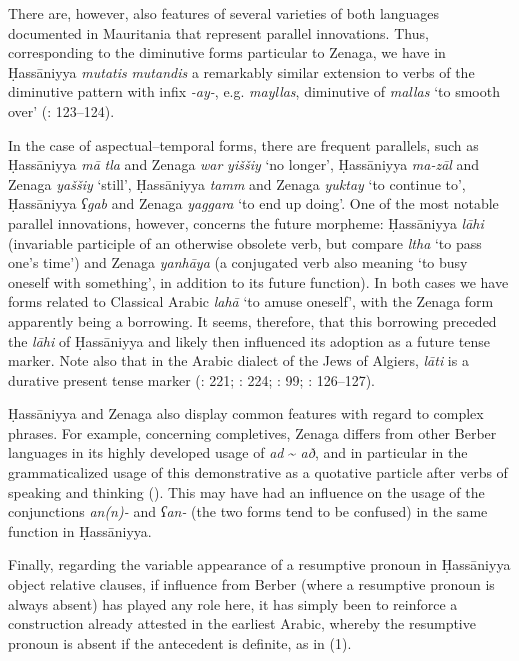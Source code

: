 \documentclass[output=paper]{langsci/langscibook}
\begin{document}
There are, however, also features of several varieties of both languages documented in Mauritania that represent parallel innovations. Thus, corresponding to the diminutive forms particular to Zenaga, we have in Ḥassāniyya \textit{mutatis} \textit{mutandis} a remarkably similar extension to verbs of the diminutive pattern with infix \textit{-ay-}, e.g. \textit{mayllas}, diminutive of \textit{mallas} ‘to smooth over’ (\citealt{Taine-Cheikh2008chapter}: 123–124).

In the case of aspectual--temporal forms, there are frequent parallels, such as Ḥassāniyya \textit{mā} \textit{tla} and Zenaga \textit{war} \textit{yiššiy} ‘no longer’, Ḥassāniyya \textit{ma-zāl} and Zenaga \textit{yaššiy} ‘still’, Ḥassāniyya \textit{tamm} and Zenaga \textit{yuktay} ‘to continue to’, Ḥassāniyya \textit{ʕgab} and Zenaga \textit{yaggara} ‘to end up doing’. One of the most notable parallel innovations, however, concerns the future morpheme: Ḥassāniyya \textit{lāhi} (invariable participle of an otherwise obsolete verb, but compare \textit{ltha} ‘to pass one’s time’) and Zenaga \textit{yanhāya} (a conjugated verb also meaning ‘to busy oneself with something’, in addition to its future function). In both cases we have forms related to Classical Arabic \textit{lahā} ‘to amuse oneself’, with the Zenaga form apparently being a borrowing. It seems, therefore, that this borrowing preceded the \textit{lāhi} of Ḥassāniyya and likely then influenced its adoption as a future tense marker. Note also that in the Arabic dialect of the Jews of Algiers, \textit{lāti} is a durative present tense marker (\citealt{Cohen1924}: 221; \citealt{Taine-Cheikh2004}: 224; \citealt{Taine-Cheikh2009}: 99; \citealt{Taine-Cheikh2010Zenaga}: 126–127).

Ḥassāniyya and Zenaga also display common features with regard to complex phrases. For example, concerning completives, Zenaga differs from other Berber languages in its highly developed usage of \textit{ad} \~{} \textit{að}, and in particular in the grammaticalized usage of this demonstrative as a quotative particle after verbs of speaking and thinking (\citealt{Taine-Cheikh2010Zenaga}). This may have had an influence on the usage of the conjunctions \textit{an(n)-} and \textit{ʕan-} (the two forms tend to be confused) in the same function in Ḥassāniyya.

Finally, regarding the variable appearance of a resumptive pronoun in Ḥassāniyya object relative clauses, if influence from Berber (where a resumptive pronoun is always absent) has played any role here, it has simply been to reinforce a construction already attested in the earliest Arabic, whereby the resumptive pronoun is absent if the antecedent is definite, as in ‎(1).
\end{document}
